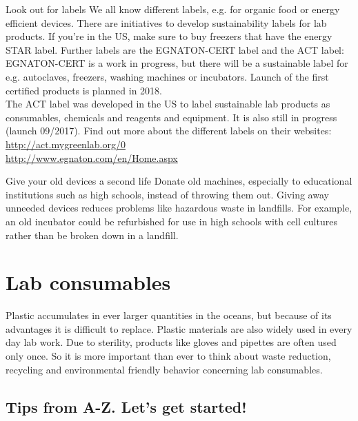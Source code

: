 \begin{suggest}{Look out for labels}
	We all know different labels, e.g. for organic food or energy efficient devices. There are initiatives to develop sustainability labels for lab products. If you're in the US, make sure to buy freezers that have the energy STAR label. 
	Further labels are the EGNATON-CERT label and the ACT label: \\
	EGNATON-CERT is a work in progress, but there will be a sustainable label for e.g. autoclaves, freezers, washing machines or incubators. Launch of the first certified products is planned in 2018. \\
	The ACT label was developed in the US to label sustainable lab products as consumables, chemicals and reagents and equipment. It is also still in progress (launch 09/2017). Find out more about the different labels on their websites: \\
	\url{http://act.mygreenlab.org/0} \\
	\url{http://www.egnaton.com/en/Home.aspx}
\end{suggest}
	

\begin{suggest}{Give your old devices a second life}
	Donate old machines, especially to educational institutions such as high schools, instead of throwing them out. Giving away unneeded devices reduces problems like hazardous waste in landfills. For example, an old incubator could be refurbished for use in high schools with cell cultures rather than be broken down in a landfill.	
\end{suggest}	
	
\section{Lab consumables}
Plastic accumulates in ever larger quantities in the oceans, but because of its advantages it is difficult to replace. 
Plastic materials are also widely used in every day lab work. Due to sterility, products like gloves and pipettes are often used only once. 
So it is more important than ever to think about waste reduction, recycling and environmental friendly behavior concerning lab consumables.

\subsection{Tips from A-Z. Let's get started!} 

